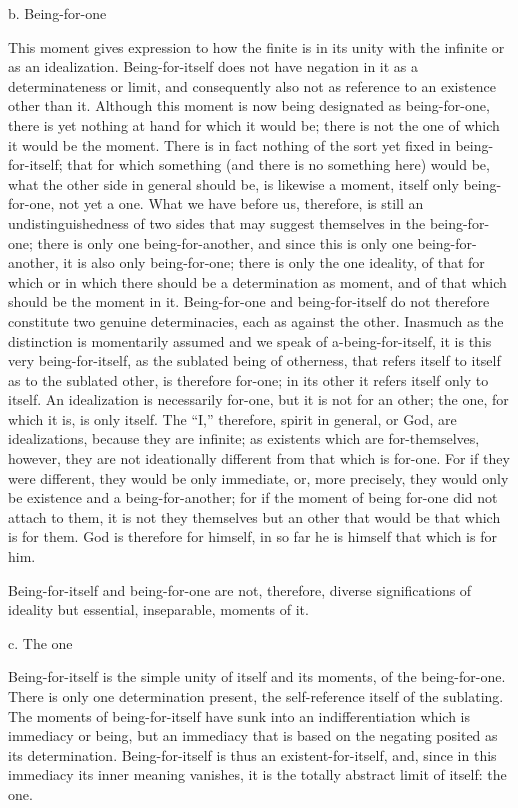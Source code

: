 b. Being-for-one

This moment gives expression to how the finite is
in its unity with the infinite or as an idealization.
Being-for-itself does not have negation in it as
a determinateness or limit,
and consequently also not as reference
to an existence other than it.
Although this moment is now being
designated as being-for-one,
there is yet nothing at hand for which it would be;
there is not the one of which it would be the moment.
There is in fact nothing of the sort
yet fixed in being-for-itself;
that for which something (and there is no something here)
would be, what the other side in general should be,
is likewise a moment, itself only being-for-one, not yet a one.
What we have before us, therefore,
is still an undistinguishedness of two sides
that may suggest themselves in the being-for-one;
there is only one being-for-another,
and since this is only one being-for-another,
it is also only being-for-one;
there is only the one ideality,
of that for which or in which
there should be a determination as moment,
and of that which should be the moment in it.
Being-for-one and being-for-itself do not therefore
constitute two genuine determinacies,
each as against the other.
Inasmuch as the distinction is momentarily assumed
and we speak of a-being-for-itself,
it is this very being-for-itself,
as the sublated being of otherness,
that refers itself to itself as to the sublated other,
is therefore for-one;
in its other it refers itself only to itself.
An idealization is necessarily for-one,
but it is not for an other;
the one, for which it is, is only itself.
The “I,” therefore, spirit in general,
or God, are idealizations,
because they are infinite;
as existents which are for-themselves, however,
they are not ideationally different
from that which is for-one.
For if they were different,
they would be only immediate,
or, more precisely, they would only be
existence and a being-for-another;
for if the moment of being for-one did
not attach to them,
it is not they themselves
but an other that would be
that which is for them.
God is therefore for himself,
in so far he is himself
that which is for him.

Being-for-itself and being-for-one are not, therefore,
diverse significations of ideality
but essential, inseparable, moments of it.

c. The one

Being-for-itself is the simple unity of
itself and its moments, of the being-for-one.
There is only one determination present,
the self-reference itself of the sublating.
The moments of being-for-itself have sunk into
an indifferentiation which is immediacy or being,
but an immediacy that is based on
the negating posited as its determination.
Being-for-itself is thus an existent-for-itself,
and, since in this immediacy its inner meaning vanishes,
it is the totally abstract limit of itself: the one.

